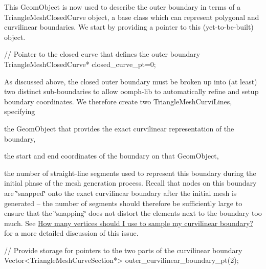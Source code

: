 This {\ttfamily Geom\+Object} is now used to describe the outer boundary in terms of a {\ttfamily Triangle\+Mesh\+Closed\+Curve} object, a base class which can represent polygonal and curvilinear boundaries. We start by providing a pointer to this (yet-\/to-\/be-\/built) object.


\begin{DoxyCodeInclude}

 \textcolor{comment}{// Pointer to the closed curve that defines the outer boundary}
 TriangleMeshClosedCurve* closed\_curve\_pt=0;

\end{DoxyCodeInclude}


As discussed above, the closed outer boundary must be broken up into (at least) two distinct sub-\/boundaries to allow {\ttfamily oomph-\/lib} to automatically refine and setup boundary coordinates. We therefore create two {\ttfamily Triangle\+Mesh\+Curvi\+Lines}, specifying
\begin{DoxyItemize}
\item the {\ttfamily Geom\+Object} that provides the exact curvilinear representation of the boundary, ~\newline
~\newline

\item the start and end coordinates of the boundary on that {\ttfamily Geom\+Object}, ~\newline
~\newline

\item the number of straight-\/line segments used to represent this boundary during the initial phase of the mesh generation process. Recall that nodes on this boundary are \char`\"{}snapped\char`\"{} onto the exact curvilinear boundary after the initial mesh is generated -- the number of segments should therefore be sufficiently large to ensure that the \char`\"{}snapping\char`\"{} does not distort the elements next to the boundary too much. See \hyperlink{index_how_many_segments}{How many vertices should I use to sample my curvilinear boundary?} for a more detailed discussion of this issue.
\end{DoxyItemize}
\begin{DoxyCodeInclude}
   \textcolor{comment}{// Provide storage for pointers to the two parts of the curvilinear boundary}
   Vector<TriangleMeshCurveSection*> outer\_curvilinear\_boundary\_pt(2);

\end{DoxyCodeInclude}


